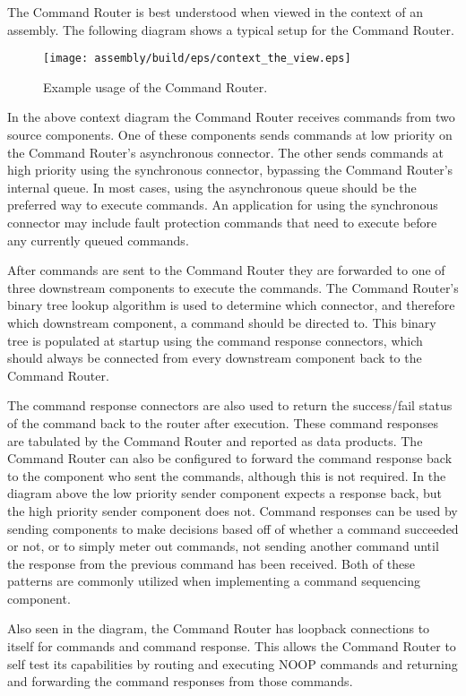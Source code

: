 The Command Router is best understood when viewed in the context of an assembly. The following diagram shows a typical setup for the Command Router. 

\begin{figure}[H]
  \texttt{[image: assembly/build/eps/context\_the\_view.eps]}
  \caption{Example usage of the Command Router.}
\end{figure}

In the above context diagram the Command Router receives commands from two source components. One of these components sends commands at low priority on the Command Router's asynchronous connector. The other sends commands at high priority using the synchronous connector, bypassing the Command Router's internal queue. In most cases, using the asynchronous queue should be the preferred way to execute commands. An application for using the synchronous connector may include fault protection commands that need to execute before any currently queued commands.

After commands are sent to the Command Router they are forwarded to one of three downstream components to execute the commands. The Command Router's binary tree lookup algorithm is used to determine which connector, and therefore which downstream component, a command should be directed to. This binary tree is populated at startup using the command response connectors, which should always be connected from every downstream component back to the Command Router.

The command response connectors are also used to return the success/fail status of the command back to the router after execution. These command responses are tabulated by the Command Router and reported as data products. The Command Router can also be configured to forward the command response back to the component who sent the commands, although this is not required. In the diagram above the low priority sender component expects a response back, but the high priority sender component does not. Command responses can be used by sending components to make decisions based off of whether a command succeeded or not, or to simply meter out commands, not sending another command until the response from the previous command has been received. Both of these patterns are commonly utilized when implementing a command sequencing component.

Also seen in the diagram, the Command Router has loopback connections to itself for commands and command response. This allows the Command Router to self test its capabilities by routing and executing NOOP commands and returning and forwarding the command responses from those commands.
